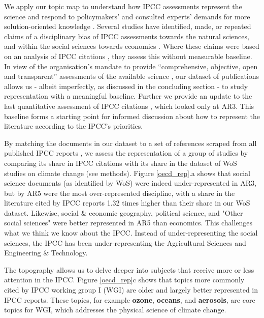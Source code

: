 \documentclass{article}
\begin{document}
\begin{linenumbers}
		
		We apply our topic map to understand how IPCC assessments represent the science and respond to policymakers' and consulted experts' demands for more solution-oriented knowledge \cite{Kowarsch2017}.  Several studies have identified, made, or repeated claims of a disciplinary bias of IPCC assessments towards the natural sciences, and within the social sciences towards economics \cite{Bjurstroem2011, Victor2015, Hulme2010, Corbera2016}. Where these claims were based on an analysis of IPCC citations \cite{Bjurstroem2011}, they assess this without measurable baseline. 
		In view of the organisation's mandate to provide ``comprehensive, objective, open and transparent'' assessments of the available science \cite{IPCC2013}, our dataset of publications allows us - albeit imperfectly, as discussed in the concluding section - to study representation with a meaningful baseline. Further we provide an update to the last quantitative assessment of IPCC citations \cite{Bjurstroem2011}, which looked only at AR3. 
		This baseline forms a starting point for informed discussion about how to represent the literature according to the IPCC's priorities.  
		
		
		By matching the documents in our dataset to a set of references scraped from all published IPCC reports \cite{Minx2017l}, we assess the representation of a group of studies by comparing its share in IPCC citations with its share in the dataset of WoS studies on climate change (see methods). 		
		Figure \ref{oecd_rep}.a shows that social science documents (as identified by WoS) were indeed under-represented in AR3, but by AR5 were the most over-represented discipline, with a share in the literature cited by IPCC reports 1.32 times higher than their share in our WoS dataset. Likewise, social \& economic geography, political science, and "Other social sciences" were better represented in AR5 than economics. 	
		This challenges what we think we know about the IPCC. 
		Instead of under-representing the social sciences, the IPCC has been under-representing the Agricultural Sciences and Engineering \& Technology.
		
		
		The topography allows us to delve deeper into subjects that receive more or less attention in the IPCC. 
		Figure \ref{oecd_rep}c shows that topics more commonly cited by IPCC working group I (WGI) are older and largely better represented in IPCC reports. These topics, for example \textbf{ozone}, \textbf{oceans}, and \textbf{aerosols}, are core topics for WGI, which addresses the physical science of climate change.
		

\end{linenumbers}
\end{document}
